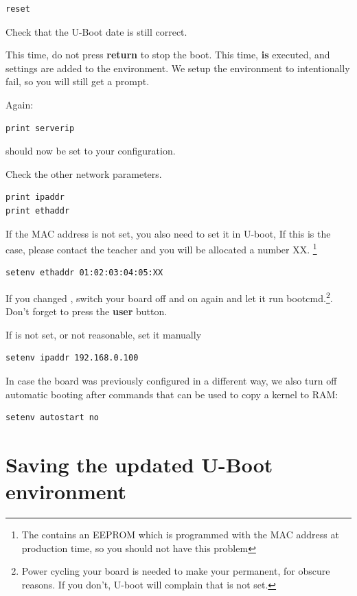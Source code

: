\begin{verbatim}
reset
\end{verbatim}

Check that the U-Boot date is still correct.

This time, do not press {\bf return} to stop the boot. This time,  {\bf is} executed,
and  settings are added to the environment.
We setup the environment to intentionally fail, so you will still get a prompt.

Again:

\begin{verbatim}
print serverip
\end{verbatim}

 should now be set to your configuration.

Check the other network parameters.
\begin{verbatim}
print ipaddr
print ethaddr
\end{verbatim}

If the MAC address is not set, you also need to set it in U-boot,
If this is the case, please contact the teacher and you will be allocated
a number XX. \footnote{The \devboard contains an EEPROM which is programmed with the MAC address
 at production time, so you should not have this problem}

\begin{verbatim}
setenv ethaddr 01:02:03:04:05:XX
\end{verbatim}

If you changed , switch your board off and on again and let it run bootcmd.\footnote{Power cycling your board is needed to make your  permanent, for obscure
  reasons. If you don't, U-boot will complain that  is not
  set.}. Don't forget to press the {\bf user} button.

If  is not set, or not reasonable, set it manually

\begin{verbatim}
setenv ipaddr 192.168.0.100
\end{verbatim}

In case the board was previously configured in a different way, we
also turn off automatic booting after commands that can be used to
copy a kernel to RAM:

\begin{verbatim}
setenv autostart no
\end{verbatim}

\clearpage
\section{Saving the updated U-Boot environment}

